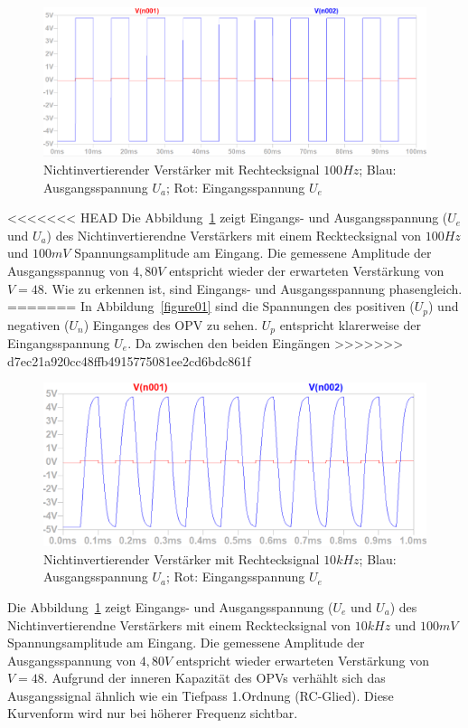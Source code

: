 \documentclass[12pt,a4paper,titlepage]{article}
\begin{document}
\begin{figure}[H]
  \centering
  \includegraphics[width=150mm]{nichtinvertierend_pulse_eingangs_ausgangsspannung}
  \caption{Nichtinvertierender Verst\"arker mit Rechtecksignal $100Hz$; Blau: Ausgangsspannung $U_a$; Rot: Eingangsspannung $U_e$}
  \label{figure03}
\end{figure}
<<<<<<< HEAD
Die Abbildung~\ref{figure03} zeigt Eingangs- und Ausgangsspannung ($U_e$ und $U_a$) des Nichtinvertierendne Verst\"arkers mit einem Recktecksignal von $100Hz$ und $100mV$ Spannungsamplitude am Eingang. Die gemessene Amplitude der Ausgangsspannug von $4,80V$ entspricht wieder der erwarteten Verst\"arkung von $V = 48$. Wie zu erkennen ist, sind Eingangs- und Ausgangsspannung phasengleich.
=======
In Abbildung~\ref{figure01} sind die Spannungen des positiven ($U_p$) und negativen ($U_n$) Einganges des OPV zu sehen. $U_p$ entspricht klarerweise der Eingangsspannung $U_e$. Da zwischen den beiden Eing\"angen
>>>>>>> d7ec21a920cc48ffb4915775081ee2cd6bdc861f

\begin{figure}[H]
  \centering
  \includegraphics[width=150mm]{nichtinvertierend_pulse2_eingangs_ausgangsspannung}
  \caption{Nichtinvertierender Verst\"arker mit Rechtecksignal $10kHz$; Blau: Ausgangsspannung $U_a$; Rot: Eingangsspannung $U_e$}
  \label{figure04}
\end{figure}
Die Abbildung~\ref{figure03} zeigt Eingangs- und Ausgangsspannung ($U_e$ und $U_a$) des Nichtinvertierendne Verst\"arkers mit einem Recktecksignal von $10kHz$ und $100mV$ Spannungsamplitude am Eingang. Die gemessene Amplitude der Ausgangsspannung von $4,80V$ entspricht wieder erwarteten Verst\"arkung von $V = 48$. Aufgrund der inneren Kapazit\"at des OPVs verh\"ahlt sich das Ausgangssignal \"ahnlich wie ein Tiefpass 1.Ordnung (RC-Glied). Diese Kurvenform wird nur bei h\"oherer Frequenz sichtbar.
\end{document}
